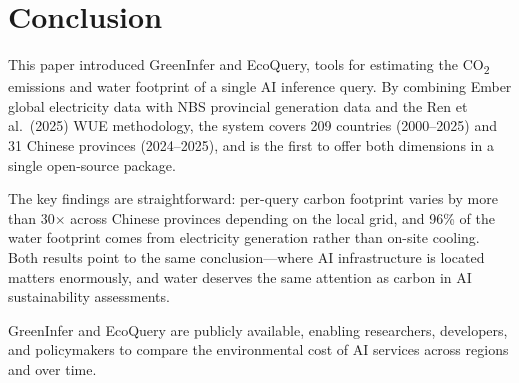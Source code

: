 \documentclass[11pt,a4paper]{article}
\begin{document}
\section{Conclusion}

This paper introduced GreenInfer and EcoQuery, tools for estimating the
CO\textsubscript{2} emissions and water footprint of a single AI inference
query. By combining Ember global electricity data with NBS provincial
generation data and the Ren et al.\ (2025) WUE methodology, the system
covers 209 countries (2000--2025) and 31 Chinese provinces (2024--2025),
and is the first to offer both dimensions in a single open-source package.

The key findings are straightforward: per-query carbon footprint varies by
more than 30$\times$ across Chinese provinces depending on the local grid,
and 96\% of the water footprint comes from electricity generation rather
than on-site cooling. Both results point to the same conclusion---where AI
infrastructure is located matters enormously, and water deserves the same
attention as carbon in AI sustainability assessments.

GreenInfer and EcoQuery are publicly available, enabling researchers,
developers, and policymakers to compare the environmental cost of AI
services across regions and over time.
\end{document}
